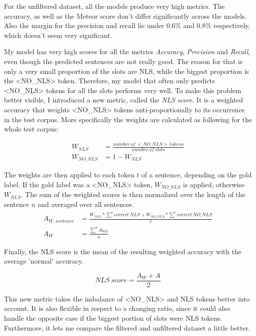 \documentclass[
	11pt, %
]{fphw}
\begin{document}
For the unfiltered dataset, all the models produce very high metrics. The accuracy, as well as the Meteor score don't differ significantly across the models. Also the margin for the precision and recall lie under 0.6\% and 0.8\% respectively, which doesn't seem very significant.

My model has very high scores for all the metrics \emph{Accuracy}, \emph{Precision} and \emph{Recall}, even though the predicted sentences are not really good. The reason for that is only a very small proportion of the slots are NLS, while the biggest proportion is the <NO\_NLS> token. Therefore, my model that often only predicts <NO\_NLS> tokens for all the slots performs very well. To make this problem better visible, I introduced a new metric, called the \emph{NLS score}. It is a weighted accuracy that weights <NO\_NLS> tokens anti-proportionally to its occurrence in the test corpus. More specifically the weights are calculated as following for the whole test corpus:

\begin{align}
    W_{NLS}     & = \frac{number\ of\ <NO\_NLS>\ tokens}{number\ of\ slots} \\
    W_{NO\_NLS} & = 1 - W_{NLS}
\end{align}

The weights are then applied to each token $t$ of a sentence, depending on the gold label. If the gold label was a <NO\_NLS> token, $W_{NO\_NLS}$ is applied, otherwise $W_{NLS}$. The sum of the weighted scores is then normalized over the length of the sentence $n$ and averaged over all sentences.
\begin{align}
    A_{W,sentence} & = \frac{W_{NLS} * \sum_{}^{t}{correct\ NLS} + W_{NO\_NLS} *\sum_{}^{t}{correct\ NO\_NLS}}{t} \\
    A_W            & = \frac{\sum_{}^{n}A_{WS}}{n}
\end{align}

Finally, the NLS score is the mean of the resulting weighted accuracy with the average 'normal' accuracy.

\begin{equation}
    NLS\ score = \frac{A_W + A}{2}
\end{equation}

This new metric takes the imbalance of <NO\_NLS> and NLS tokens better into account. It is also flexible in respect to a changing ratio, since it could also handle the opposite case if the biggest portion of slots were NLS tokens. Furthermore, it lets me compare the filtered and unfiltered dataset a little better.
\end{document}

